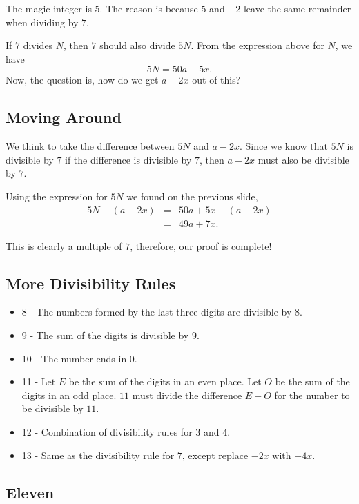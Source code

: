 The magic integer is $5$. The reason is because $5$ and $-2$ leave the same remainder when dividing by $7$.

If $7$ divides $N$, then $7$ should also divide $5N$.  From the expression above for $N$, we have $$5N=50a+5x.$$  Now, the question is, how do we get $a-2x$ out of this?  

\subsection*{Moving Around}

We think to take the difference between $5N$ and $a-2x$.  Since we know that $5N$ is divisible by $7$ if the difference is divisible by $7$, then $a-2x$ must also be divisible by $7$.

Using the expression for $5N$ we found on the previous slide, \begin{eqnarray*} 5N-(a-2x) &=& 50a+5x-(a-2x) \\ &=& 49a+7x. \end{eqnarray*}

This is clearly a multiple of $7$, therefore, our proof is complete!  





\clearpage

\subsection{More Divisibility Rules}

\begin{itemize}
	\item  8 - The numbers formed by the last three digits are divisible by $8$.
	\item 9 - The sum of the digits is divisible by $9$.
	\item 10 - The number ends in $0$.
	\item 11 - Let $E$ be the sum of the digits in an even place. Let $O$ be the sum of the digits in an odd place. $11$ must divide the difference $E-O$ for the number to be divisible by $11$.
	\item 12 - Combination of divisibility rules for $3$ and $4$.
	\item 13 -  Same as the divisibility rule for $7$, except replace $-2x$ with $+4x$.  
\end{itemize}

\subsection{Eleven}

